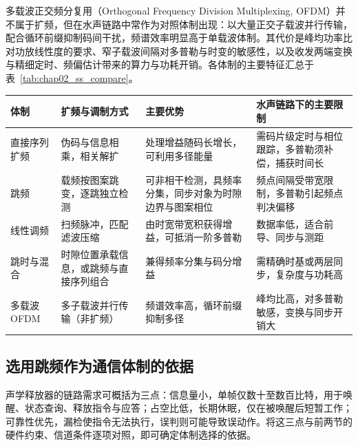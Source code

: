 多载波正交频分复用（Orthogonal Frequency Division Multiplexing, OFDM）并不属于扩频，但在水声链路中常作为对照体制出现：以大量正交子载波并行传输，配合循环前缀抑制码间干扰，频谱效率明显高于单载波体制\cite{harkatSurveyMIMOOFDMSystems2022,ZhuShiLinJiYuOFDMMFSKDeShuiXiaShengTongXinJiShuYanJiu2023}。其代价是峰均功率比对功放线性度的要求、窄子载波间隔对多普勒与时变的敏感性，以及收发两端变换与精细定时、频偏估计带来的算力与功耗开销。各体制的主要特征汇总于表~\ref{tab:chap02_ss_compare}。

\begin{table}[htbp]
  \vspace{0.5em}\centering\wuhao
  \begin{tabularx}{\linewidth}{@{}p{2.45cm}p{3.20cm}p{3.70cm}X@{}}
    \toprule[1.5pt]
    体制 & 扩频与调制方式 & 主要优势 & 水声链路下的主要限制 \\
    \midrule[1pt]
    直接序列扩频 & 伪码与信息相乘，相关解扩 & 处理增益随码长增长，可利用多径能量 & 需码片级定时与相位跟踪，多普勒须补偿，捕获时间长 \\
    跳频 & 载频按图案跳变，逐跳独立检测 & 可非相干检测，具频率分集，同步对象为时隙边界与图案相位 & 频点间隔受带宽限制，多普勒引起频点判决偏移 \\
    线性调频 & 扫频脉冲，匹配滤波压缩 & 由时宽带宽积获得增益，可抵消一阶多普勒 & 数据率低，适合前导、同步与测距 \\
    跳时与混合 & 时隙位置承载信息，或跳频与直接序列组合 & 兼得频率分集与码分增益 & 需精确时基或两层同步，复杂度与功耗高 \\
    多载波 OFDM & 多子载波并行传输（非扩频） & 频谱效率高，循环前缀抑制多径 & 峰均比高，对多普勒敏感，变换与同步开销大 \\
    \bottomrule[1.5pt]
  \end{tabularx}
\end{table}

\subsection{选用跳频作为通信体制的依据}
\label{sec:chap02_fh_choice}

声学释放器的链路需求可概括为三点：信息量小，单帧仅数十至数百比特，用于唤醒、状态查询、释放指令与应答；占空比低，长期休眠，仅在被唤醒后短暂工作；可靠性优先，漏检使指令无法执行，误判则可能导致误动作\cite{liuUnderwaterAcousticRelease2026}。将这三点与前两节的硬件约束、信道条件逐项对照，即可确定体制选择的依据。

